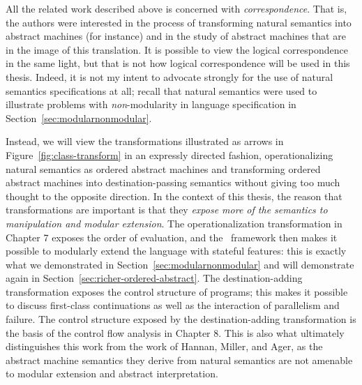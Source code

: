 All the related work described above is concerned with {\it
  correspondence}. That is, the authors were interested in the process
of transforming natural semantics into abstract machines (for
instance) and in the study of abstract machines that are in the image
of this translation. It is possible to view the logical correspondence
in the same light, but that is not how logical correspondence will be
used in this thesis.  Indeed, it is not my intent to advocate strongly
for the use of natural semantics specifications at all; recall that
natural semantics were used to illustrate problems with {\it
  non}-modularity in language specification in
Section~\ref{sec:modularnonmodular}.

Instead, we will view the transformations illustrated as arrows in
Figure~\ref{fig:class-transform} in an expressly directed fashion,
operationalizing natural semantics as ordered abstract machines and
transforming ordered abstract machines into destination-passing
semantics without giving too much thought to the opposite
direction. In the context of this thesis, the reason that
transformations are important is that they {\it expose more of the
  semantics to manipulation and modular extension}.  The
operationalization transformation in Chapter 7 exposes the order of
evaluation, and the \sls~framework then makes it possible to modularly
extend the language with stateful features: this is exactly what we
demonstrated in Section~\ref{sec:modularnonmodular} and will
demonstrate again in Section~\ref{sec:richer-ordered-abstract}.  The
destination-adding transformation exposes the control structure of
programs; this makes it possible to discuss first-class continuations
as well as the interaction of parallelism and failure.  The control
structure exposed by the destination-adding transformation is the
basis of the control flow analysis in Chapter 8. This is also what
ultimately distinguishes this work from the work of Hannan, Miller,
and Ager, as the abstract machine semantics they derive from natural
semantics are not amenable to modular extension and abstract
interpretation.

